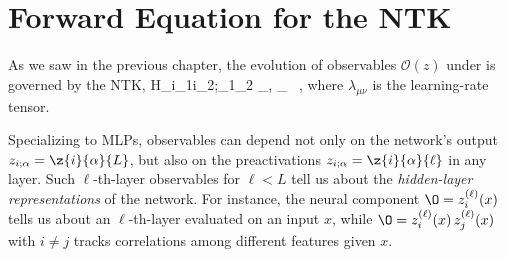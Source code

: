 \setcounter{section}{-1}
\section{Forward Equation for the NTK}\label{sec:NTH-recursions}
As we saw in the previous chapter, 
the evolution of observables $\mathcal{O}(z)$ under  is governed by the NTK,
\be\label{eq:NTH-definition-reprint}
H_{i_1i_2;\alpha_1\alpha_2} \equiv \sum_{\mu,\nu} \lambda_{\mu\nu}  \,  ,
\ee
where $\lambda_{\mu\nu}$ is the learning-rate tensor. %

Specializing to MLPs, observables can depend not only  on the network's output $z_{i;\alpha}=\z{i}{\alpha}{L}$, but also on the preactivations $z_{i;\alpha}=\z{i}{\alpha}{\ell}$ in any layer. Such $\ell$-th-layer observables for $\ell <L$ tell us about the \emph{hidden-layer representations} of the network. For instance, the neural component $\O = z_i^{(\ell)}(x)$ tells us about an $\ell$-th-layer  evaluated on an input $x$, while $\O = z_i^{(\ell)}(x)\, z_j^{(\ell)}(x)$ with  $i\neq j$ tracks correlations among different features given $x$.

